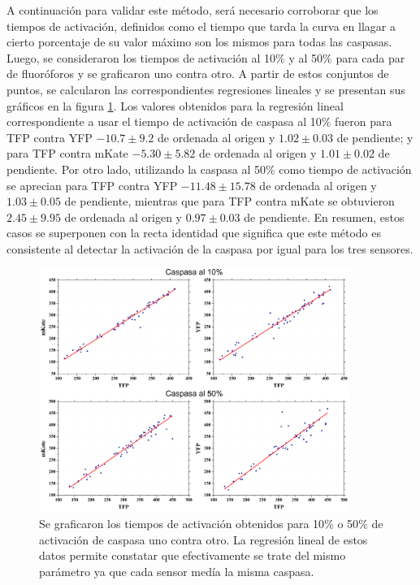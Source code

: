 A continuación para validar este método, será necesario corroborar que los tiempos de activación, definidos como el tiempo que tarda la curva en llagar a cierto porcentaje de su valor máximo son los mismos para todas las caspasas. Luego, se consideraron los tiempos de activación al 10$\%$ y al 50$\%$ para cada par de fluoróforos y se graficaron uno contra otro. A partir de estos conjuntos de puntos, se calcularon las correspondientes regresiones lineales y se presentan sus gráficos en la figura \ref{fig:OneCasp_reg}. Los valores obtenidos para la regresión lineal correspondiente a usar el tiempo de activación de caspasa al 10$\%$ fueron para TFP contra YFP $-10.7 \pm 9.2$ de ordenada al origen y $1.02 \pm 0.03$ de pendiente; y para TFP contra mKate $-5.30 \pm 5.82$ de ordenada al origen y $1.01 \pm 0.02$ de pendiente. Por otro lado, utilizando la caspasa al 50$\%$ como tiempo de activación se aprecian para TFP contra YFP $-11.48 \pm 15.78$ de ordenada al origen y $1.03 \pm 0.05$ de pendiente, mientras que para TFP contra mKate se obtuvieron $2.45 \pm 9.95$ de ordenada al origen y $0.97 \pm 0.03$ de pendiente. En resumen, estos casos se superponen con la recta identidad que significa que este método es consistente al detectar la activación de la caspasa por igual para los tres sensores.








\begin{figure}
    \centering
    \includegraphics[width=0.9\textwidth]{./img/Cap4/CaspReg.png}
    \caption{Se graficaron los tiempos de activación obtenidos para 10$\%$ o 50$\%$ de activación de caspasa uno contra otro. La regresión lineal de estos datos permite constatar que efectivamente se trate del mismo parámetro ya que cada sensor medía la misma caspasa.}
    \label{fig:OneCasp_reg}
\end{figure}

